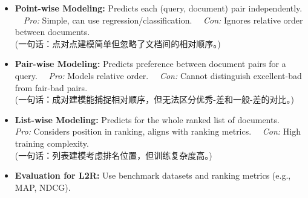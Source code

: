 \documentclass[UTF8]{ctexart}
\begin{document}
\begin{itemize}
    \item \textbf{Point-wise Modeling:} Predicts each (query, document) pair independently.\newline
    $\quad$\textit{Pro:} Simple, can use regression/classification.\newline
    $\quad$\textit{Con:} Ignores relative order between documents.\\
    (一句话：点对点建模简单但忽略了文档间的相对顺序。)
    \item \textbf{Pair-wise Modeling:} Predicts preference between document pairs for a query.\newline
    $\quad$\textit{Pro:} Models relative order.\newline
    $\quad$\textit{Con:} Cannot distinguish excellent-bad from fair-bad pairs.\\
    (一句话：成对建模能捕捉相对顺序，但无法区分优秀-差和一般-差的对比。)
    \item \textbf{List-wise Modeling:} Predicts for the whole ranked list of documents.\newline
    $\quad$\textit{Pro:} Considers position in ranking, aligns with ranking metrics.\newline
    $\quad$\textit{Con:} High training complexity.\\
    (一句话：列表建模考虑排名位置，但训练复杂度高。)
\end{itemize}

\begin{itemize}
    \item \textbf{Evaluation for L2R:} Use benchmark datasets and ranking metrics (e.g., MAP, NDCG).
\end{itemize}
\end{document}
